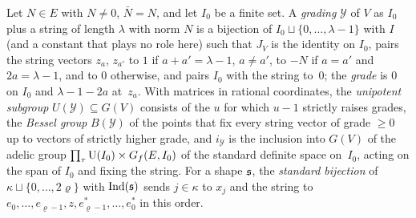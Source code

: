 \documentclass[11pt,a4paper]{article}
\theoremstyle{plainx}
\theoremstyle{uprightx}
\newcommand{\incl}[1]{i_{#1}}                         %
\newcommand{\Uni}[1]{U(#1)}                           %
\newcommand{\Bes}[1]{B(#1)}                           %
\begin{document}
Let $N\in E$ with $N\ne0$, $\bar N=N$, and let $I_0$ be a finite set. A \emph{grading} $\mathcal{Y}$ of $V$ as
$I_0$ plus a string of length $\lambda$ with norm $N$ is a bijection of $I_0\sqcup\{0,\dots,\lambda-1\}$ with $I$
(and a constant that plays no role here) such that $J_V$ is the identity on $I_0$, pairs the string vectors $z_a$,
$z_{a'}$ to $1$ if $a+a'=\lambda-1$, $a\ne a'$, to $-N$ if $a=a'$ and $2a=\lambda-1$, and to $0$ otherwise, and pairs $I_0$
with the string to~$0$; the \emph{grade} is $0$ on $I_0$ and $\lambda-1-2a$ at~$z_a$. With matrices in rational
coordinates, the \emph{unipotent subgroup} $\Uni{\mathcal{Y}}\subseteq G(V)$ consists of the $u$ for which $u-1$
strictly raises grades, the \emph{Bessel group} $\Bes{\mathcal{Y}}$ of the points that fix every string vector of
grade $\ge0$ up to vectors of strictly higher grade, and $\incl{\mathcal{Y}}$ is the inclusion into $G(V)$ of the
adelic group $\prod_\tau\mathrm{U}(I_0)\times G_{f}(E,I_0)$ of the standard definite space on~$I_0$, acting on the span of
$I_0$ and fixing the string. For a shape $\mathfrak{s}$, the \emph{standard bijection} of $\kappa\sqcup\{0,\dots,2\varrho\}$
with $\operatorname{Ind}(\mathfrak{s})$ sends $j\in\kappa$ to $x_j$ and the string to $e_0,\dots,e_{\varrho-1},z,e^*_{\varrho-1},\dots,e^*_0$
in this order.
\end{document}

